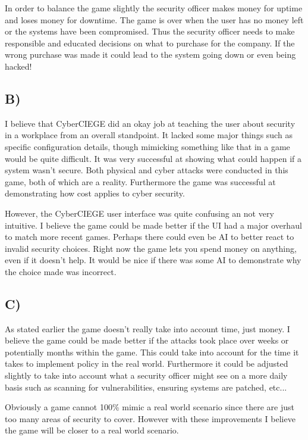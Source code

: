 \documentclass[fleqn, 12pt]{article}
\begin{document}
In order to balance the game slightly the security officer makes money for uptime and loses money for downtime. The game is over when the user has no money left or the systems have been compromised. Thus the security officer needs to make responsible and educated decisions on what to purchase for the company. If the wrong purchase was made it could lead to the system going down or even being hacked!

\subsection*{B)}

I believe that CyberCIEGE did an okay job at teaching the user about security in a workplace from an overall standpoint. It lacked some major things such as specific configuration details, though mimicking something like that in a game would be quite difficult. It was very successful at showing what could happen if a system wasn't secure. Both physical and cyber attacks were conducted in this game, both of which are a reality. Furthermore the game was successful at demonstrating how cost applies to cyber security.

However, the CyberCIEGE user interface was quite confusing an not very intuitive. I believe the game could be made better if the UI had a major overhaul to match more recent games. Perhaps there could even be AI to better react to invalid security choices. Right now the game lets you spend money on anything, even if it doesn't help. It would be nice if there was some AI to demonstrate why the choice made was incorrect.

\subsection*{C)}

As stated earlier the game doesn't really take into account time, just money. I believe the game could be made better if the attacks took place over weeks or potentially months within the game. This could take into account for the time it takes to implement policy in the real world. Furthermore it could be adjusted slightly to take into account what a security officer might see on a more daily basis such as scanning for vulnerabilities, ensuring systems are patched, etc...

Obviously a game cannot 100\% mimic a real world scenario since there are just too many areas of security to cover. However with these improvements I believe the game will be closer to a real world scenario.
\end{document}
